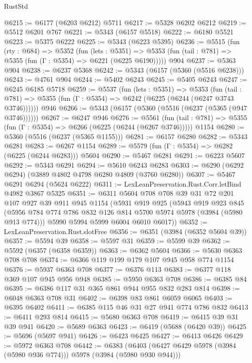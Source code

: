 \begin{lexlean}{RustStd}
\begin{coremodule}
@6215 := @6177 (@6203 @6212) @5711
@6217 := @5328 @6202 @6212
@6219 := @5512 @6201 @767
@6221 := @5343 (@6157 @5518)
@6222 := @6180 @5521
@6223 := @5375 @6222
@6225 := @5343 (@6223 @5395)
@6236 := @5515
    (fun (rty : @684) =>
    @5352
      (fun (lets : @5351) =>
      @5353 (fun (tail : @781) => @5355 (fun (Γ : @5354) => @6221 (@6225 @6190)))))
    @904
@6237 := @5363 @904
@6238 := @6237 @5368
@6242 := @5343 (@6157 (@5360 (@5516 @6238)))
@6243 := @4761 @904
@6244 := @5402 @6243
@6245 := @5405 @6243
@6247 := @6245 @6185 @5718
@6259 := @5537
    (fun (lets : @5351) =>
    @5353
      (fun (tail : @781) => @5355 (fun (Γ : @5354) => @6242 (@6225 (@6244 (@6247 @3743 @3746))))))
    @946
@6266 := @5343 (@6157 (@5360 (@5516 (@6237 (@5365 (@947 @3746))))))
@6267 := @6247 @946
@6276 := @5561
    (fun (tail : @781) => @5355 (fun (Γ : @5354) => @6266 (@6225 (@6244 (@6267 @3746)))))
    @1154
@6280 := @5360 (@5516 (@6237 (@5365 @1155)))
@6281 := @6157 @6280
@6282 := @5343 @6281
@6283 := @6267 @1154
@6289 := @5579 (fun (Γ : @5354) => @6282 (@6225 (@6244 @6283))) @5604
@6290 := @5467 @6281
@6291 := @6223 @5607
@6292 := @5343 @6291
@6294 := @5610 @6243 @6283
@6303 := @6290 (@6292 @6294) (@3889 @4802 @4798 @6280 @4809 (@3760 @6280))
@6307 := @5467 @6291 @6294 (@5624 @6222)
@6311 := LexLeanPreservation.Rust.Corr.letBind @4982 @3867 @5325
@6351 := @6311
    @5604
    @708
    @708
    @39
    @31
    @72
    @201
    @107
    @927
    @39
    @911
    @945
    @1154
    (@5931
      @919
      @925
      (@5943
        @919
        @923
        @845
        (@5956 @784 @774 @786 @832 @126 @814 @5700 @5974 @5978 (@3984 (@5980 @913 @774)))
        @5990
        @5994
        @5999
        @6004
        @6010
        @6017))
@6352 := LexLeanPreservation.Rust.slotFree
@6356 := @6351 (@3984 (@6352 @5604 @39))
@6357 := @5594 @39
@6358 := @5597 @31
@6359 := @5599 @39
@6362 := @5592 (@6357 (@6358 @6359))
@6363 := @6362 @5604
@6366 := @5630 @6363 @708 @708
@6374 := @6366 @119 @199 @179 @107 @945 @958 @774 @1154
@6376 := @5937 @6363 @708
@6377 := @6376 @113
@6383 := @6377 @118 @369 @107 @945 @956 @948
@6385 := @5950 @6363 @708
@6386 := @6385 @84
@6395 := @6386 @117 @31 @365 @861 @944 @955 @832 @283 @814
@6398 := @6048 @6363 @708 @31
@6402 := @6398 @83 @861 @6059 @6065
@6403 := @6395 @6402
@6411 := @6385 @115 @46 @31 @27 @941 @774 @786 @832
@6413 := @6411 @293 @814
@6415 := @5680 @6363 @708
@6419 := @6415 @39 @31 @39 @941
@6420 := @5689 @6363
@6423 := @6419 (@5688 (@6420 @39))
@6425 := @5696 (@5697 @941)
@6426 := @6423 @6425
@6427 := @6413 @6426
@6429 := @5972 @6363 @708
@6442 := @6383 (@6403 (@6427 @6429 @5978 (@3984 (@5980 @936 @774))) @5978 (@3984 (@5980 @930 @944)))

\end{coremodule}
\end{lexlean}
